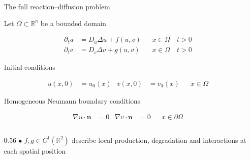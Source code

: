 \begin{frame}{The full reaction--diffusion problem}

  \vspace{-0.42cm}

  {\color{HydraWhite}\fontsize{8.4}{10.3}\selectfont
    Let $\Omega\subset\mathbb R^n$ be a bounded domain
  \par}

  \vspace{-0.26cm}

  {\color{HydraWhite}\fontsize{9.8}{12.4}\selectfont
  \begin{align*}
    \partial_tu
    &=D_u\Delta u+f(u,v)
    &&x\in\Omega
    \quad t>0
    \\
    \partial_tv
    &=D_v\Delta v+g(u,v)
    &&x\in\Omega
    \quad t>0
  \end{align*}
  }

  \vspace{0.16cm}

  {\color{HydraWhite}\fontsize{8.4}{10.3}\selectfont
    Initial conditions\par}

  \vspace{-0.28cm}

  {\color{HydraWhite}\fontsize{9.3}{11.7}\selectfont
  \begin{align*}
    u(x,0)&=u_0(x)
    &
    v(x,0)&=v_0(x)
    &&x\in\Omega
  \end{align*}
  }

  \vspace{-0.38cm}

  {\color{HydraWhite}\fontsize{8.4}{10.3}\selectfont
    Homogeneous Neumann boundary conditions\par}

  \vspace{-0.28cm}

  {\color{HydraWhite}\fontsize{9.3}{11.7}\selectfont
  \begin{align*}
    \nabla u\cdot\mathbf n
    &=0
    &
    \nabla v\cdot\mathbf n
    &=0
    &&x\in\partial\Omega
  \end{align*}
  }

  \vspace{-0.28cm}

  \begin{columns}[T,onlytextwidth]

    \begin{column}{0.56\textwidth}
      {\color{HydraGold}\fontsize{10}{10}\selectfont
        $\bullet$
      }
      {\color{HydraMuted}\fontsize{7.4}{9}\selectfont
        $f,g\in C^1(\mathbb R^2)$ describe local production,
        degradation and interactions at each spatial position
      }
    \end{column}


\end{columns}
\end{frame}
